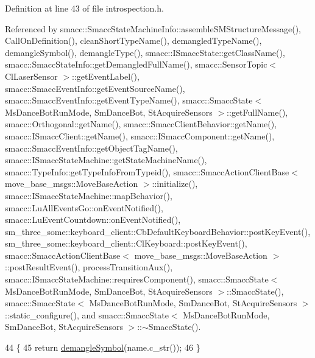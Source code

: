 Definition at line 43 of file introspection.\+h.



Referenced by smacc\+::\+Smacc\+State\+Machine\+Info\+::assemble\+S\+M\+Structure\+Message(), Call\+On\+Definition(), clean\+Short\+Type\+Name(), demangled\+Type\+Name(), demangle\+Symbol(), demangle\+Type(), smacc\+::\+I\+Smacc\+State\+::get\+Class\+Name(), smacc\+::\+Smacc\+State\+Info\+::get\+Demangled\+Full\+Name(), smacc\+::\+Sensor\+Topic$<$ Cl\+Laser\+Sensor $>$\+::get\+Event\+Label(), smacc\+::\+Smacc\+Event\+Info\+::get\+Event\+Source\+Name(), smacc\+::\+Smacc\+Event\+Info\+::get\+Event\+Type\+Name(), smacc\+::\+Smacc\+State$<$ Ms\+Dance\+Bot\+Run\+Mode, Sm\+Dance\+Bot, St\+Acquire\+Sensors $>$\+::get\+Full\+Name(), smacc\+::\+Orthogonal\+::get\+Name(), smacc\+::\+Smacc\+Client\+Behavior\+::get\+Name(), smacc\+::\+I\+Smacc\+Client\+::get\+Name(), smacc\+::\+I\+Smacc\+Component\+::get\+Name(), smacc\+::\+Smacc\+Event\+Info\+::get\+Object\+Tag\+Name(), smacc\+::\+I\+Smacc\+State\+Machine\+::get\+State\+Machine\+Name(), smacc\+::\+Type\+Info\+::get\+Type\+Info\+From\+Typeid(), smacc\+::\+Smacc\+Action\+Client\+Base$<$ move\+\_\+base\+\_\+msgs\+::\+Move\+Base\+Action $>$\+::initialize(), smacc\+::\+I\+Smacc\+State\+Machine\+::map\+Behavior(), smacc\+::\+Lu\+All\+Events\+Go\+::on\+Event\+Notified(), smacc\+::\+Lu\+Event\+Countdown\+::on\+Event\+Notified(), sm\+\_\+three\+\_\+some\+::keyboard\+\_\+client\+::\+Cb\+Default\+Keyboard\+Behavior\+::post\+Key\+Event(), sm\+\_\+three\+\_\+some\+::keyboard\+\_\+client\+::\+Cl\+Keyboard\+::post\+Key\+Event(), smacc\+::\+Smacc\+Action\+Client\+Base$<$ move\+\_\+base\+\_\+msgs\+::\+Move\+Base\+Action $>$\+::post\+Result\+Event(), process\+Transition\+Aux(), smacc\+::\+I\+Smacc\+State\+Machine\+::requires\+Component(), smacc\+::\+Smacc\+State$<$ Ms\+Dance\+Bot\+Run\+Mode, Sm\+Dance\+Bot, St\+Acquire\+Sensors $>$\+::\+Smacc\+State(), smacc\+::\+Smacc\+State$<$ Ms\+Dance\+Bot\+Run\+Mode, Sm\+Dance\+Bot, St\+Acquire\+Sensors $>$\+::static\+\_\+configure(), and smacc\+::\+Smacc\+State$<$ Ms\+Dance\+Bot\+Run\+Mode, Sm\+Dance\+Bot, St\+Acquire\+Sensors $>$\+::$\sim$\+Smacc\+State().


\begin{DoxyCode}
44 \{
45     \textcolor{keywordflow}{return} \hyperlink{namespacesmacc_a4dd421d5d4e7617fcf4a9a756797adda}{demangleSymbol}(name.c\_str());
46 \}
\end{DoxyCode}


